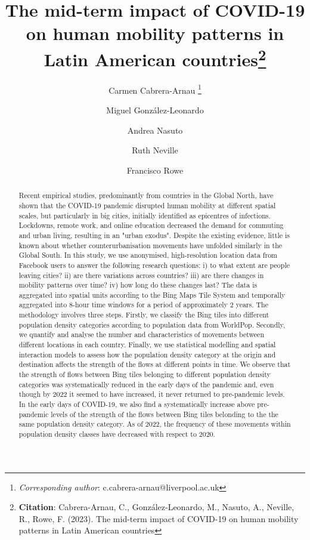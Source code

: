 \documentclass[11pt,letterpaper]{article}
\title{The mid-term impact of COVID-19 on human mobility patterns in Latin American countries\footnote{\textbf{Citation}: Cabrera-Arnau, C., González-Leonardo, M., Nasuto, A., Neville, R., Rowe, F. (2023). The mid-term impact of COVID-19 on human mobility patterns in Latin American countries}}
\author[1]{Carmen Cabrera-Arnau \thanks{\textit{Corresponding author}: c.cabrera-arnau@liverpool.ac.uk}}
\author[2]{Miguel González-Leonardo}
\author[1]{Andrea Nasuto}
\author[1]{Ruth Neville}
\author[1]{Francisco Rowe}
\affil[1]{Geographic Data Science Lab, Department of Geography and Planning, University of Liverpool, Liverpool, United Kingdom}
\affil[2]{Center for Demographic, Urban and Environmental Studies, El Colegio de México (COLMEX), Mexico City, Mexico}
\date{}
\begin{document}
\maketitle


\begin{abstract}

Recent empirical studies, predominantly from countries in the Global North, have shown that the COVID-19 pandemic disrupted human mobility at different spatial scales, but particularly in big cities, initially identified as epicentres of infections. Lockdowns, remote work, and online education decreased the demand for commuting and urban living, resulting in an "urban exodus". Despite the existing evidence, little is known about whether counterurbanisation movements have unfolded similarly in the Global South. In this study, we use anonymised, high-resolution location data from Facebook users to answer the following research questions: i) to what extent are people leaving cities? ii) are there variations across countries? iii) are there changes in mobility patterns over time? iv) how long do these changes last? The data is aggregated into spatial units according to the Bing Maps Tile System and temporally aggregated into 8-hour time windows for a period of approximately 2 years. The methodology involves three steps. Firstly, we classify the Bing tiles into different population density categories according to population data from WorldPop. Secondly, we quantify and analyse the number and characteristics of movements between different locations in each country. Finally, we use statistical modelling and spatial interaction models to assess how the population density category at the origin and destination affects the strength of the flows at different points in time. We observe that the strength of flows between Bing tiles belonging to different population density categories was systematically reduced in the early days of the pandemic and, even though by 2022 it seemed to have increased, it never returned to pre-pandemic levels. In the early days of COVID-19, we also find a systematically increase above pre-pandemic levels of the strength of the flows between Bing tiles belonding to the the same population density category. As of 2022, the frequency of these movements within population density classes have decreased with respect to 2020.

\end{abstract}
\end{document}
